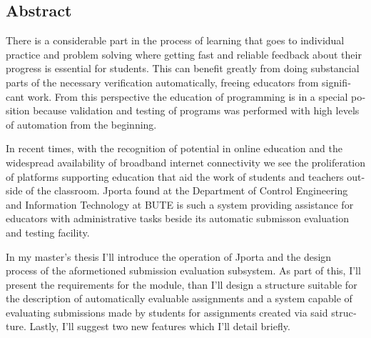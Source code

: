 \begin{otherlanguage}{english}
\chapter*{Abstract}%

There is a considerable part in the process of learning that goes to individual practice and problem solving where getting fast and reliable feedback about their progress is essential for students.
This can benefit greatly from doing substancial parts of the necessary verification automatically, freeing educators from significant work.
From this perspective the education of programming is in a special position because validation and testing of programs was performed with high levels of automation from the beginning.

In recent times, with the recognition of potential in online education and the widespread availability of broadband internet connectivity we see the proliferation of platforms supporting education that aid the work of students and teachers outside of the classroom.
Jporta found at the Department of Control Engineering and Information Technology at BUTE is such a system providing assistance for educators with administrative tasks beside its automatic submisson evaluation and testing facility.

In my master's thesis I'll introduce the operation of Jporta and the design process of the aformetioned submission evaluation subsystem.
As part of this, I'll present the requirements for the module, than I'll design a structure suitable for the description of automatically evaluable assignments and a system capable of evaluating submissions made by students for assignments created via said structure.
Lastly, I'll suggest two new features which I'll detail briefly.
\end{otherlanguage}
\vfill

